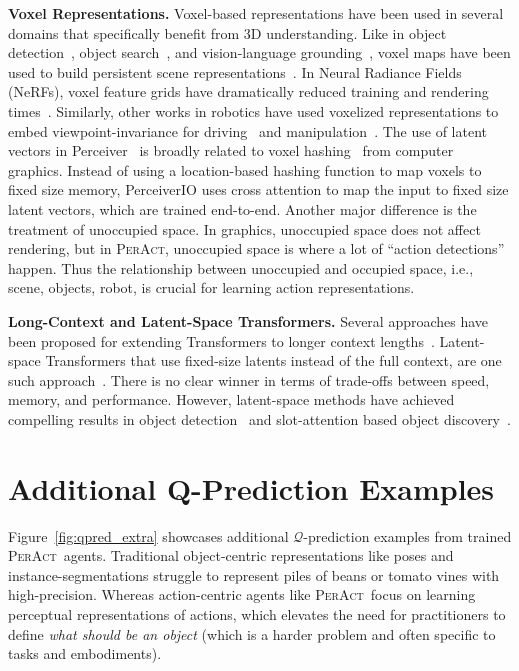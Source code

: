 \documentclass{article}
\newcommand{\figref}[1]{Figure~\ref{#1}}
\newcommand{\ie}{\textrm{i.e.,}\xspace}
\newcommand{\model}{\textsc{PerAct}}
\begin{document}
\textbf{Voxel Representations.} Voxel-based representations have been used in several domains that specifically benefit from 3D understanding.
Like in object detection~\citep{mao2021voxel,he2022voxel}, object search~\citep{zheng2022towards}, and vision-language grounding~\citep{blukis2022persistent,corona-etal-2022-voxel}, voxel maps have been used to build persistent scene representations~\citep{sitzmann2019deepvoxels}.
In Neural Radiance Fields (NeRFs), voxel feature grids have dramatically reduced training and rendering times~\citep{mueller2022instant,yu_and_fridovichkeil2021plenoxels}. Similarly, other works in robotics have used voxelized representations to embed viewpoint-invariance for driving~\citep{lal2021coconets} and manipulation~\citep{tung20203d}. The use of latent vectors in Perceiver~\citep{jaegle2021perceiver} is broadly related to voxel hashing~\citep{niessner2013real} from computer graphics. Instead of using a location-based hashing function to map voxels to fixed size memory, PerceiverIO uses cross attention to map the input to fixed size latent vectors, which are trained end-to-end. Another major difference is the treatment of unoccupied space. In graphics, unoccupied space does not affect  rendering, but in \model, unoccupied space is where a lot of ``action detections'' happen. Thus the relationship between unoccupied and occupied space, \ie scene, objects, robot, is crucial for learning action representations.

\textbf{Long-Context and Latent-Space Transformers.} Several approaches have been proposed for extending Transformers to longer context lengths~\citep{tay2020efficient}. Latent-space Transformers that use fixed-size latents instead of the full context, are one such approach~\citep{jaegle2021perceiver,goyal2021coordination}. There is no clear winner in terms of trade-offs between speed, memory, and performance. However, latent-space methods have achieved compelling results in object detection~\citep{carion2020end} and slot-attention based object discovery~\citep{locatello2020object}.

\section{Additional Q-Prediction Examples} \label{app:more_qpred}
\figref{fig:qpred_extra} showcases additional $\mathcal{Q}$-prediction examples from trained \model~agents. Traditional object-centric representations like poses and instance-segmentations struggle to represent piles of beans or tomato vines with high-precision. Whereas action-centric agents like \model~focus on learning perceptual representations of actions, which elevates the need for practitioners to define \textit{what should be an object} (which is a harder problem and often specific to tasks and embodiments). 
\end{document}

